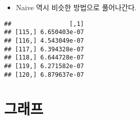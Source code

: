 \documentclass[
]{article}
\newenvironment{Shaded}{\begin{snugshade}}{\end{snugshade}}
\newcommand{\DataTypeTok}[1]{\textcolor[rgb]{0.13,0.29,0.53}{#1}}
\newcommand{\DecValTok}[1]{\textcolor[rgb]{0.00,0.00,0.81}{#1}}
\newcommand{\KeywordTok}[1]{\textcolor[rgb]{0.13,0.29,0.53}{\textbf{#1}}}
\newcommand{\NormalTok}[1]{#1}
\newcommand{\OperatorTok}[1]{\textcolor[rgb]{0.81,0.36,0.00}{\textbf{#1}}}
\newcommand{\StringTok}[1]{\textcolor[rgb]{0.31,0.60,0.02}{#1}}
\providecommand{\tightlist}{%
  \setlength{\itemsep}{0pt}\setlength{\parskip}{0pt}}
\begin{document}
\begin{itemize}
\tightlist
\item
  Naive 역시 비슷한 방법으로 풀어나간다.
\end{itemize}

\begin{Shaded}
\end{Shaded}

\begin{verbatim}
##                [,1]
## [115,] 6.650403e-07
## [116,] 4.543049e-07
## [117,] 6.394328e-07
## [118,] 6.644728e-07
## [119,] 6.271582e-07
## [120,] 6.879637e-07
\end{verbatim}

\hypertarget{uxadf8uxb798uxd504}{%
\section{그래프}\label{uxadf8uxb798uxd504}}
\end{document}
